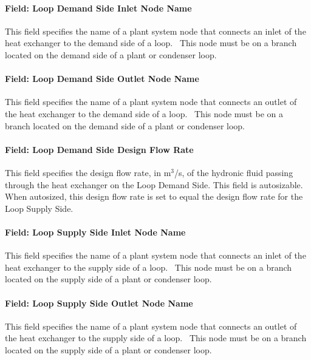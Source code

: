 \paragraph{Field: Loop Demand Side Inlet Node Name}\label{field-loop-demand-side-inlet-node-name}

This field specifies the name of a plant system node that connects an inlet of the heat exchanger to the demand side of a loop.~ This node must be on a branch located on the demand side of a plant or condenser loop.

\paragraph{Field: Loop Demand Side Outlet Node Name}\label{field-loop-demand-side-outlet-node-name}

This field specifies the name of a plant system node that connects an outlet of the heat exchanger to the demand side of a loop.~ This node must be on a branch located on the demand side of a plant or condenser loop.

\paragraph{Field: Loop Demand Side Design Flow Rate}\label{field-loop-demand-side-design-flow-rate}

This field specifies the design flow rate, in m\(^{3}\)/s, of the hydronic fluid passing through the heat exchanger on the Loop Demand Side. This field is autosizable. When autosized, this design flow rate is set to equal the design flow rate for the Loop Supply Side.

\paragraph{Field: Loop Supply Side Inlet Node Name}\label{field-loop-supply-side-inlet-node-name}

This field specifies the name of a plant system node that connects an inlet of the heat exchanger to the supply side of a loop.~ This node must be on a branch located on the supply side of a plant or condenser loop.

\paragraph{Field: Loop Supply Side Outlet Node Name}\label{field-loop-supply-side-outlet-node-name}

This field specifies the name of a plant system node that connects an outlet of the heat exchanger to the supply side of a loop.~ This node must be on a branch located on the supply side of a plant or condenser loop.

